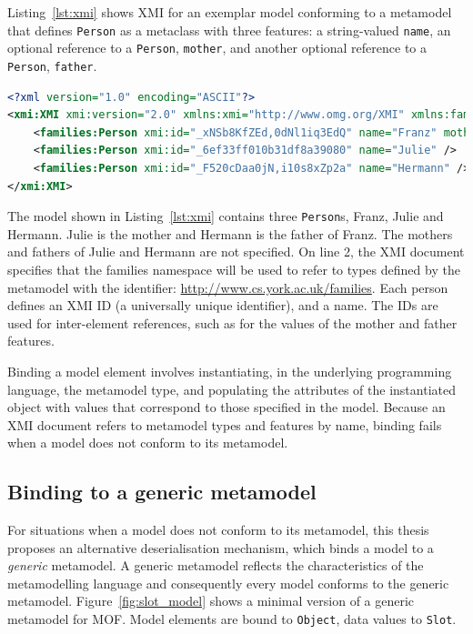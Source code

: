Listing~\ref{lst:xmi} shows XMI for an exemplar model conforming to a metamodel that defines \texttt{Person} as a metaclass with three features: a string-valued \texttt{name}, an optional reference to a \texttt{Person}, \texttt{mother}, and another optional reference to a \texttt{Person}, \texttt{father}.

\begin{lstlisting}[caption=Exemplar person model in XMI, label=lst:xmi, language=XML]
<?xml version="1.0" encoding="ASCII"?>
<xmi:XMI xmi:version="2.0" xmlns:xmi="http://www.omg.org/XMI" xmlns:families="http://www.cs.york.ac.uk/families">
	<families:Person xmi:id="_xNSb8KfZEd,0dNl1iq3EdQ" name="Franz" mother="_6ef33ff010b31df8a39080" father="_F520cDaa0jN,i10s8xZp2a" />
	<families:Person xmi:id="_6ef33ff010b31df8a39080" name="Julie" />
	<families:Person xmi:id="_F520cDaa0jN,i10s8xZp2a" name="Hermann" />
</xmi:XMI>
\end{lstlisting}

The model shown in Listing~\ref{lst:xmi} contains three \texttt{Person}s, Franz, Julie and Hermann. Julie is the mother and Hermann is the father of Franz. The mothers and fathers of Julie and Hermann are not specified. On line 2, the XMI document specifies that the families namespace will be used to refer to types defined by the metamodel with the identifier: \url{http://www.cs.york.ac.uk/families}. Each person defines an XMI ID (a universally unique identifier), and a name. The IDs are used for inter-element references, such as for the values of the mother and father features.

Binding a model element involves instantiating, in the underlying programming language, the metamodel type, and populating the attributes of the instantiated object with values that correspond to those specified in the model. Because an XMI document refers to metamodel types and features by name, binding fails when a model does not conform to its metamodel. 


\subsection{Binding to a generic metamodel}
\label{subsec:binding}
For situations when a model does not conform to its metamodel, this thesis proposes an alternative deserialisation mechanism, which binds a model to a \emph{generic} metamodel. A generic metamodel reflects the characteristics of the metamodelling language and consequently every model conforms to the generic metamodel. Figure~\ref{fig:slot_model} shows a minimal version of a generic metamodel for MOF. Model elements are bound to \texttt{Object}, data values to \texttt{Slot}.

